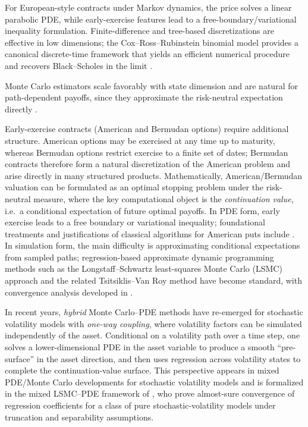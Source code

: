 \documentclass[10pt]{article}
\theoremstyle{plain}
\theoremstyle{definition}
\theoremstyle{remark}
\begin{document}
For European-style contracts under Markov dynamics, the price solves a linear parabolic PDE, while early-exercise features lead to a free-boundary/variational inequality formulation.
Finite-difference and tree-based discretizations are effective in low dimensions; the Cox--Ross--Rubinstein binomial model provides a canonical discrete-time framework that yields an efficient numerical procedure and recovers Black--Scholes in the limit \citep{cox1979option}.

Monte Carlo estimators scale favorably with state dimension and are natural for path-dependent payoffs, since they approximate the risk-neutral expectation directly \citep{glasserman2004montecarlo}.

Early-exercise contracts (American and Bermudan options) require additional structure.
American options may be exercised at any time up to maturity, whereas Bermudan options restrict exercise to a finite set of dates; Bermudan contracts therefore form a natural discretization of the American problem and arise directly in many structured products.
Mathematically, American/Bermudan valuation can be formulated as an optimal stopping problem under the risk-neutral measure, where the key computational object is the \emph{continuation value}, i.e.\ a conditional expectation of future optimal payoffs.
In PDE form, early exercise leads to a free boundary or variational inequality; foundational treatments and justifications of classical algorithms for American puts include \citep{merton1977americanput,jaillet1990variational}.
In simulation form, the main difficulty is approximating conditional expectations from sampled paths; regression-based approximate dynamic programming methods such as the Longstaff--Schwartz least-squares Monte Carlo (LSMC) approach \citep{longstaff2001valuing} and the related Tsitsiklis--Van Roy method \citep{tsitsiklis2001regression} have become standard, with convergence analysis developed in \citep{clement2002analysis}.

In recent years, \emph{hybrid} Monte Carlo--PDE methods have re-emerged for stochastic volatility models with \emph{one-way coupling}, where volatility factors can be simulated independently of the asset.
Conditional on a volatility path over a time step, one solves a lower-dimensional PDE in the asset variable to produce a smooth ``pre-surface'' in the asset direction, and then uses regression across volatility states to complete the continuation-value surface.
This perspective appears in mixed PDE/Monte Carlo developments for stochastic volatility models \citep{loeper2009mixed,lipp2013mixing,cozma2017mixed} and is formalized in the mixed LSMC--PDE framework of \citet{farahany2020mixing}, who prove almost-sure convergence of regression coefficients for a class of pure stochastic-volatility models under truncation and separability assumptions.
\end{document}
